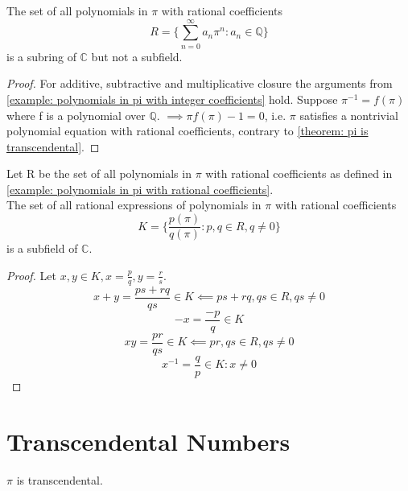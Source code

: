 \documentclass{book}
\begin{document}
\begin{examples}
    \begin{example} \label{example: polynomials in pi with rational coefficients}
        The set of all polynomials in \(\pi\) with rational coefficients
        \[R = \{\sum_{n = 0}^\infty a_n\pi^n : a_n \in \mathbb{Q}\}\]
        is a subring of \(\mathbb{C}\) but not a subfield.
    \end{example}
    \begin{proof}
        For additive, subtractive and multiplicative closure the arguments from \cref{example: polynomials in pi with integer coefficients} hold.
        Suppose \(\pi^{-1} = f(\pi)\) where f is a polynomial over \(\mathbb{Q}\).
        \(\implies \pi f(\pi) - 1 = 0\), i.e. \(\pi\) satisfies a nontrivial polynomial equation with rational coefficients,
        contrary to \cref{theorem: pi is transcendental}. 
    \end{proof}

    \begin{example}
        Let R be the set of all polynomials in \(\pi\) with rational coefficients
        as defined in \cref{example: polynomials in pi with rational coefficients}.\\
        The set of all rational expressions of polynomials in \(\pi\) with rational coefficients
        \[K = \{\frac{p(\pi)}{q(\pi)} : p,q \in R, q \neq 0\}\]
        is a subfield of \(\mathbb{C}\).
    \end{example}
    \begin{proof}
        Let \(x,y \in K,x = \frac{p}{q},y = \frac{r}{s}\).
        \[x + y = \frac{ps + rq}{qs} \in K \impliedby ps + rq,qs \in R,qs \neq 0\]
        \[-x = \frac{-p}{q} \in K\]
        \[xy = \frac{pr}{qs} \in K \impliedby pr,qs \in R,qs \neq 0\]
        \[x^{-1} = \frac{q}{p} \in K : x \neq 0\]
    \end{proof}
    \end{examples}

    \chapter{Transcendental Numbers}
    \begin{theorem} \label{theorem: pi is transcendental}
        \(\pi\) is transcendental.
    \end{theorem}
\end{document}
